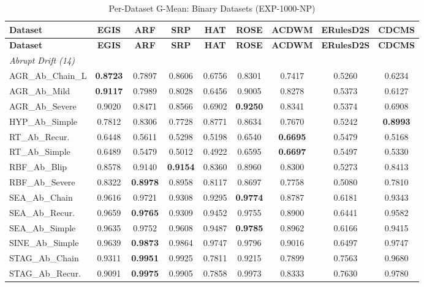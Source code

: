 \documentclass[lettersize,10pt]{article}
\begin{document}
\scriptsize
\begin{longtable}{lcccccccc}
\caption{Per-Dataset G-Mean: Binary Datasets (EXP-1000-NP)}\label{tab:s_binary_exp_1000_np} \\
\toprule
\textbf{Dataset} & \textbf{EGIS} & \textbf{ARF} & \textbf{SRP} & \textbf{HAT} & \textbf{ROSE} & \textbf{ACDWM} & \textbf{ERulesD2S} & \textbf{CDCMS} \\
\midrule
\endfirsthead
\toprule
\textbf{Dataset} & \textbf{EGIS} & \textbf{ARF} & \textbf{SRP} & \textbf{HAT} & \textbf{ROSE} & \textbf{ACDWM} & \textbf{ERulesD2S} & \textbf{CDCMS} \\
\midrule
\endhead
\midrule \multicolumn{9}{l}{\textit{Abrupt Drift (14)}}\\
\midrule
AGR\_Ab\_Chain\_L & \textbf{0.8723} & 0.7897 & 0.8606 & 0.6756 & 0.8301 & 0.7417 & 0.5260 & 0.6234 \\
AGR\_Ab\_Mild & \textbf{0.9117} & 0.7989 & 0.8028 & 0.6456 & 0.9005 & 0.8278 & 0.5373 & 0.6127 \\
AGR\_Ab\_Severe & 0.9020 & 0.8471 & 0.8566 & 0.6902 & \textbf{0.9250} & 0.8341 & 0.5374 & 0.6908 \\
HYP\_Ab\_Simple & 0.7812 & 0.8306 & 0.7728 & 0.8771 & 0.8634 & 0.7670 & 0.5242 & \textbf{0.8993} \\
RT\_Ab\_Recur. & 0.6448 & 0.5611 & 0.5298 & 0.5198 & 0.6540 & \textbf{0.6695} & 0.5479 & 0.5168 \\
RT\_Ab\_Simple & 0.6489 & 0.5479 & 0.5012 & 0.4922 & 0.6595 & \textbf{0.6697} & 0.5497 & 0.5330 \\
RBF\_Ab\_Blip & 0.8578 & 0.9140 & \textbf{0.9154} & 0.8360 & 0.8960 & 0.8300 & 0.5273 & 0.8413 \\
RBF\_Ab\_Severe & 0.8322 & \textbf{0.8978} & 0.8958 & 0.8117 & 0.8697 & 0.7758 & 0.5080 & 0.7810 \\
SEA\_Ab\_Chain & 0.9616 & 0.9721 & 0.9308 & 0.9295 & \textbf{0.9774} & 0.8787 & 0.6181 & 0.9343 \\
SEA\_Ab\_Recur. & 0.9659 & \textbf{0.9765} & 0.9309 & 0.9452 & 0.9755 & 0.8900 & 0.6441 & 0.9582 \\
SEA\_Ab\_Simple & 0.9635 & 0.9752 & 0.9608 & 0.9487 & \textbf{0.9785} & 0.8962 & 0.6166 & 0.9415 \\
SINE\_Ab\_Simple & 0.9639 & \textbf{0.9873} & 0.9864 & 0.9747 & 0.9796 & 0.9016 & 0.6497 & 0.9747 \\
STAG\_Ab\_Chain & 0.9311 & \textbf{0.9951} & 0.9925 & 0.7811 & 0.9215 & 0.7899 & 0.7563 & 0.9680 \\
STAG\_Ab\_Recur. & 0.9091 & \textbf{0.9975} & 0.9905 & 0.7858 & 0.9973 & 0.8333 & 0.7630 & 0.9780 \\

\end{longtable}
\end{document}

